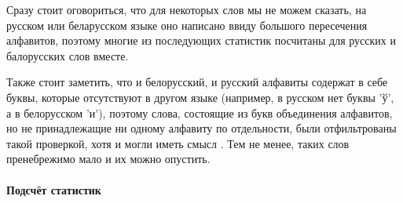 Сразу стоит оговориться, что для некоторых слов мы не можем сказать, на русском или беларусском языке оно написано ввиду большого пересечения алфавитов, поэтому многие из последующих статистик посчитаны для русских и балорусских слов вместе.

Также стоит заметить, что и белорусский, и русский алфавиты содержат в себе буквы, которые отсутствуют в другом языке (например, в русском нет буквы 'ў', а в белорусском 'и'), поэтому слова, состоящие из букв объединения алфавитов, но не принадлежащие ни одному алфавиту по отдельности, были отфильтрованы такой проверкой, хотя и могли иметь смысл . Тем не менее, таких слов пренебрежимо мало и их можно опустить.


\paragraph{Подсчёт статистик}

